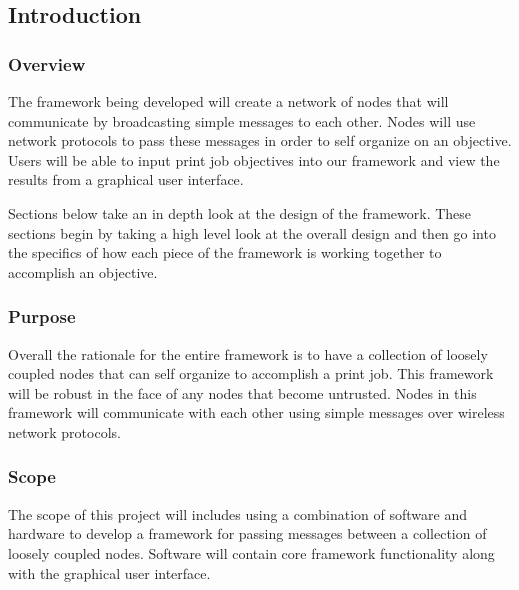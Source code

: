 

\subsection{Introduction}
\subsubsection{Overview}
The framework being developed will create a network of nodes that will communicate by broadcasting simple messages to each other. Nodes will use network protocols to pass these messages in order to self organize on an objective. Users will be able to input print job objectives into our framework and view the results from a graphical user interface.

Sections below take an in depth look at the design of the framework. These sections begin by taking a high level look at the overall design and then go into the specifics of how each piece of the framework is working together to accomplish an objective.

\subsubsection{Purpose}
Overall the rationale for the entire framework is to have a collection of loosely coupled nodes that can self organize to accomplish a print job. This framework will be robust in the face of any nodes that become untrusted. Nodes in this framework will communicate with each other using simple messages over wireless network protocols. 

\subsubsection{Scope}
The scope of this project will includes using a combination of software and hardware to develop a framework for passing messages between a collection of loosely coupled nodes. Software will contain core framework functionality along with the graphical user interface. 

